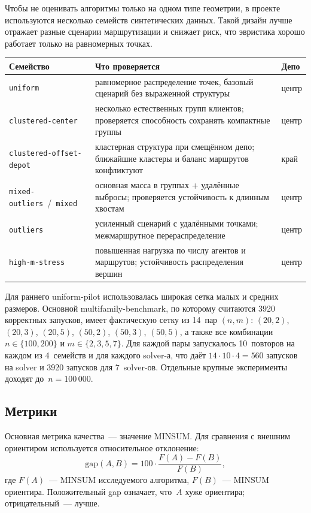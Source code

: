 \documentclass[14pt,a4paper]{extarticle}
\begin{document}
Чтобы не оценивать алгоритмы только на одном типе геометрии, в проекте используются несколько семейств синтетических данных. Такой дизайн лучше отражает разные сценарии маршрутизации и снижает риск, что эвристика хорошо работает только на равномерных точках.

\small
\begin{longtable}{>{\raggedright\arraybackslash}p{}>{\raggedright\arraybackslash}p{}>{\raggedright\arraybackslash}p{}}
\toprule
\textbf{Семейство} & \textbf{Что проверяется} & \textbf{Депо}\\
\midrule
\endhead
\texttt{uniform} & равномерное распределение точек, базовый сценарий без выраженной структуры & центр\\
\texttt{clustered-center} & несколько естественных групп клиентов; проверяется способность сохранять компактные группы & центр\\
\texttt{clustered-offset-depot} & кластерная структура при смещённом депо; ближайшие кластеры и баланс маршрутов конфликтуют & край\\
\texttt{mixed-outliers}~/~\texttt{mixed} & основная масса в группах + удалённые выбросы; проверяется устойчивость к длинным хвостам & центр\\
\texttt{outliers} & усиленный сценарий с удалёнными точками; межмаршрутное перераспределение & центр\\
\texttt{high-m-stress} & повышенная нагрузка по числу агентов и маршрутов; устойчивость распределения вершин & центр\\
\bottomrule
\end{longtable}
\normalsize

Для раннего uniform-pilot использовалась широкая сетка малых и средних размеров. Основной multifamily-benchmark, по которому считаются 3920 корректных запусков, имеет фактическую сетку из 14~пар $(n,m)$: $(20,2)$, $(20,3)$, $(20,5)$, $(50,2)$, $(50,3)$, $(50,5)$, а также все комбинации $n \in \{100,200\}$ и $m \in \{2,3,5,7\}$. Для каждой пары запускалось 10~повторов на каждом из 4~семейств и для каждого solver-а, что даёт $14 \cdot 10 \cdot 4 = 560$ запусков на solver и 3920 запусков для 7~solver-ов. Отдельные крупные эксперименты доходят до~$n = 100\,000$.

\subsection{Метрики}

Основная метрика качества~--- значение MINSUM. Для сравнения с внешним ориентиром используется относительное отклонение:
\begin{equation}
\mathrm{gap}(A, B) = 100 \cdot \frac{F(A) - F(B)}{F(B)},
\end{equation}
где $F(A)$~--- MINSUM исследуемого алгоритма, $F(B)$~--- MINSUM ориентира. Положительный gap означает, что~$A$ хуже ориентира; отрицательный~--- лучше.
\end{document}
